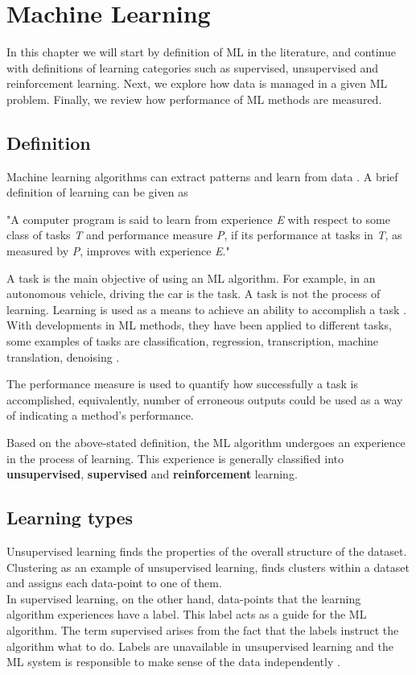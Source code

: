 \chapter{Machine Learning}
\label{chap:ML}

In this chapter we will start by definition of ML in the literature, and continue with definitions of learning categories such as supervised, unsupervised and reinforcement learning. Next, we explore how data is managed in a given ML problem. Finally, we review how performance of ML methods are measured.

\section{Definition}
Machine learning algorithms can extract patterns and learn from data \cite{IanGoodfellow2016}. A brief definition of learning can be given as \cite{mitchell1997machine}
\begin{displayquote}[][]
    "A computer program is said to learn from experience \textit{E} with respect to some class of tasks \textit{T} and performance measure \textit{P}, if its performance at tasks in \textit{T}, as measured by \textit{P}, improves with experience \textit{E}."
\end{displayquote}

A task is the main objective of using an ML algorithm. For example, in an autonomous vehicle, driving the car is the task. A task is not the process of learning. Learning is used as a means to achieve an ability to accomplish a task \cite{IanGoodfellow2016}. With developments in ML methods, they have been applied to different tasks, some examples of tasks are classification, regression, transcription, machine translation, denoising \cite{IanGoodfellow2016}.

The performance measure is used to quantify how successfully a task is accomplished, equivalently, number of erroneous outputs could be used as a way of indicating a method's performance. 

Based on the above-stated definition, the ML algorithm undergoes an experience in the process of learning. This experience is generally classified into \textbf{unsupervised}, \textbf{supervised} and \textbf{reinforcement} learning.

\section{Learning types}

Unsupervised learning finds the properties of the overall structure of the dataset. Clustering as an example of unsupervised learning, finds clusters within a dataset and assigns each data-point to one of them.\\In supervised learning, on the other hand, data-points that the learning algorithm experiences have a label. This label acts as a guide for the ML algorithm. The term supervised arises from the fact that the labels instruct the algorithm what to do. Labels are unavailable in unsupervised learning and the ML system is responsible to make sense of the data independently \cite{IanGoodfellow2016}. 

